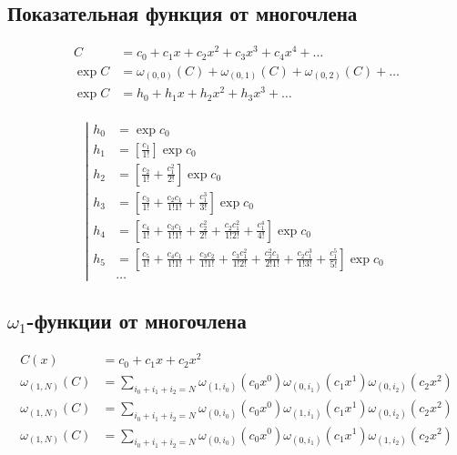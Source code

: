 \subsection{Показательная функция от многочлена}

\begin{equation*}
\begin{aligned}
C &= c_0 + c_1 x + c_2 x^2 + c_3 x^3 + c_4 x^4 + \ldots \\
\exp{C} &= \omega_{(0,0)}(C) + \omega_{(0,1)}(C) + \omega_{(0,2)}(C) + \ldots \\
\exp{C} &= h_0 + h_1 x + h_2 x^2 + h_3 x^3 + \ldots \\
\end{aligned}
\end{equation*}

\begin{equation*}
\left|
\begin{aligned}
h_0 &= \exp{c_0}
\\
h_1 
&= \left[\frac{c_1}{1!} \right] \exp{c_0}
\\ 
h_2 
&= \left[\frac{c_2}{1!} 
+ \frac{c_1^2}{2!} \right] \exp{c_0}
\\
h_3 
&= \left[\frac{c_3}{1!} 
+ \frac{c_2 c_1}{1!1!} 
+ \frac{c_1^3}{3!} \right] \exp{c_0}
\\
h_4 
&= \left[\frac{c_4}{1!} 
+ \frac{c_3 c_1}{1!1!} 
+ \frac{c_2^2}{2!} 
+ \frac{c_2 c_1^2}{1!2!} 
+ \frac{c_1^4}{4!} \right] \exp{c_0}
\\
h_5
&= \left[\frac{c_5}{1!}
+ \frac{c_4 c_1}{1!1!}
+ \frac{c_3 c_2}{1!1!}
+ \frac{c_3 c_1^2}{1!2!}
+ \frac{c_2^2 c_1}{2!1!}
+ \frac{c_2 c_1^3}{1!3!}
+ \frac{c_1^5}{5!} \right] \exp{c_0}
\\
&\ldots
\end{aligned}
\right.
\end{equation*}

\subsection{$\omega_1$-функции от многочлена}

\begin{equation*}\begin{aligned}
C(x) &= c_0 + c_1 x + c_2 x^2
\\
\omega_{(1,N)}(C) &= \sum_{i_0 + i_1 + i_2 = N}
{
  \omega_{(1,i_0)}(c_0 x^0)
  \omega_{(0,i_1)}(c_1 x^1)
  \omega_{(0,i_2)}(c_2 x^2)
} \\
\omega_{(1,N)}(C) &= \sum_{i_0 + i_1 + i_2 = N}
{
  \omega_{(0,i_0)}(c_0 x^0)
  \omega_{(1,i_1)}(c_1 x^1)
  \omega_{(0,i_2)}(c_2 x^2)
} \\
\omega_{(1,N)}(C) &= \sum_{i_0 + i_1 + i_2 = N}
{
  \omega_{(0,i_0)}(c_0 x^0)
  \omega_{(0,i_1)}(c_1 x^1)
  \omega_{(1,i_2)}(c_2 x^2)
} \\
\end{aligned}\end{equation*}


